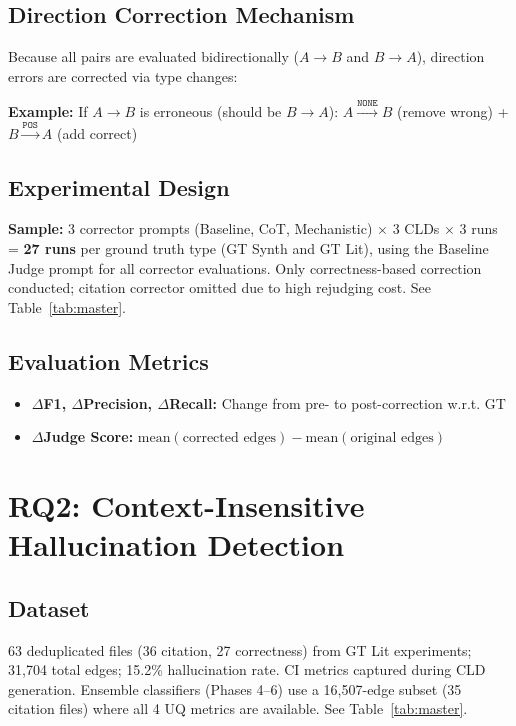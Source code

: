 \subsection{Direction Correction Mechanism}
Because all pairs are evaluated bidirectionally ($A \rightarrow B$ and $B \rightarrow A$), direction errors are corrected via type changes:

\textbf{Example:} If $A \rightarrow B$ is erroneous (should be $B \rightarrow A$):
$A \xrightarrow{\texttt{NONE}} B$ (remove wrong) + $B \xrightarrow{\texttt{POS}} A$ (add correct)

\subsection{Experimental Design}
\textbf{Sample:} 3 corrector prompts (Baseline, CoT, Mechanistic) $\times$ 3 CLDs $\times$ 3 runs = \textbf{27 runs} per ground truth type (GT Synth and GT Lit), using the Baseline Judge prompt for all corrector evaluations. Only correctness-based correction conducted; citation corrector omitted due to high rejudging cost. See Table~\ref{tab:master}.

\subsection{Evaluation Metrics}
\begin{itemize}[noitemsep]
    \item \textbf{$\Delta$F1, $\Delta$Precision, $\Delta$Recall:} Change from pre- to post-correction w.r.t. GT
    \item \textbf{$\Delta$Judge Score:} $\text{mean}(\text{corrected edges}) - \text{mean}(\text{original edges})$
\end{itemize}

\section{RQ2: Context-Insensitive Hallucination Detection}

\subsection{Dataset}
63 deduplicated files (36 citation, 27 correctness) from GT Lit experiments; 31,704 total edges; 15.2\% hallucination rate. CI metrics captured during CLD generation. Ensemble classifiers (Phases 4--6) use a 16,507-edge subset (35 citation files) where all 4 UQ metrics are available. See Table~\ref{tab:master}.

